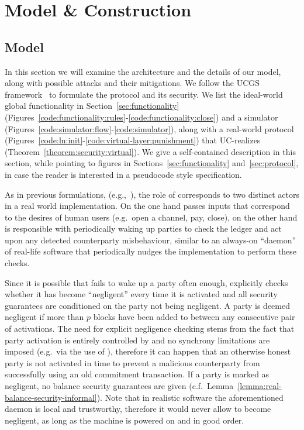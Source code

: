 \section{Model \& Construction}
\label{sec:construction}
  \subsection{Model}
  In this section we will examine the architecture and the details of our model,
  along with possible attacks and their mitigations. We follow the UCGS
  framework~\cite{DBLP:conf/tcc/BadertscherCHTZ20} to formulate the protocol and
  its security. We list the
  ideal-world global functionality \fchan in Section~\ref{sec:functionality}
  (Figures~\ref{code:functionality:rules}-\ref{code:functionality:close}) and a
  simulator \simulator (Figures~\ref{code:simulator:flow}-\ref{code:simulator}),
  along with a real-world protocol \pchan
  (Figures~\ref{code:ln:init}-\ref{code:virtual-layer:punishment}) that
  UC-realizes \fchan (Theorem~\ref{theorem:security:virtual}). We give a
  self-contained description in this section, while pointing to figures in
  Sections~\ref{sec:functionality} and~\ref{sec:protocol}, in case the reader is
  interested in a pseudocode style specification.

  As in previous formulations, (e.g.,~\cite{DBLP:conf/csfw/KiayiasL20}), the
  role of \environment corresponds to two distinct actors in a real world
  implementation. On the one hand \environment passes inputs that correspond to
  the desires of human users (e.g.\ open a channel, pay, close), on the other hand
  \environment is responsible with periodically waking up parties to check the
  ledger and act upon any detected counterparty misbehaviour, similar to an
  always-on ``daemon'' of real-life software that periodically nudges the
  implementation to perform these checks.

  Since it is possible that \environment fails to wake up a party often enough,
  \pchan explicitly checks whether it has become ``negligent'' every time it is
  activated and all security guarantees are conditioned on the party not being
  negligent. A party is deemed negligent if more than $p$ blocks have been added
  to \ledger between any consecutive pair of activations. The need for explicit
  negligence checking stems from the fact that party activation is entirely
  controlled by \environment and no synchrony limitations are imposed (e.g.\ via
  the use of \Fclock), therefore it can happen that an otherwise honest party is
  not activated in time to prevent a malicious counterparty from successfully
  using an old commitment transaction. If a party is marked as negligent, no
  balance security guarantees are given (c.f.\
  Lemma~\ref{lemma:real-balance-security-informal}). Note that in realistic
  software the aforementioned daemon is local and trustworthy, therefore it
  would never allow \pchan to become negligent, as long as the machine is
  powered on and in good order.

